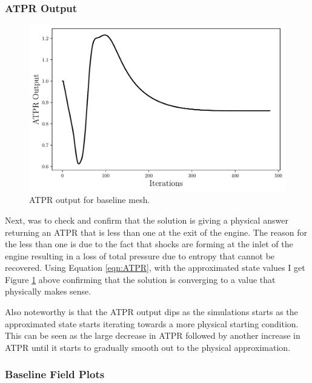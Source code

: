 \pagebreak
\subsubsection{ATPR Output}
\begin{figure}[h]
    \centering
    \includegraphics[width = 0.9\linewidth]{rep/q3/ATPR.pdf}
    \caption[ATPR Output for Baseline Mesh]{ATPR output for baseline mesh.}
    \label{fig:ATPR_mesh0}
\end{figure}

Next, was to check and confirm that the solution is giving a physical answer returning an ATPR that is less than one at the exit of the engine. The reason for the less than one is due to the fact that shocks are forming at the inlet of the engine resulting in a loss of total pressure due to entropy that cannot be recovered. Using Equation \ref{eqn:ATPR}, with the approximated state values I get Figure \ref{fig:ATPR_mesh0} above confirming that the solution is converging to a value that physically makes sense.

Also noteworthy is that the ATPR output dips as the simulations starts as the approximated state starts iterating towards a more physical starting condition. This can be seen as the large decrease in ATPR followed by another increase in ATPR until it starts to gradually smooth out to the physical approximation.

\pagebreak
\subsubsection{Baseline Field Plots}


